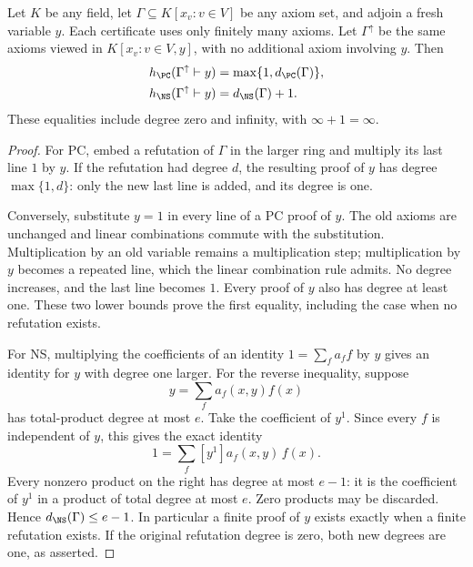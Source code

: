 \begin{proposition}\label{prop:fresh-target}
Let $K$ be any field, let $\Gamma\subseteq K[x_v:v\in V]$ be any axiom
set, and adjoin a fresh variable $y$. Each certificate uses only
finitely many axioms. Let $\Gamma^\uparrow$ be the same axioms viewed
in $K[x_v:v\in V,y]$, with no additional axiom involving $y$. Then
\begin{equation}\label{eq:fresh-identities}
 \begin{aligned}
 h_{\PC}(\Gamma^\uparrow\vdash y)
       &=\max\{1,d_{\PC}(\Gamma)\},\\
 h_{\NS}(\Gamma^\uparrow\vdash y)
       &=d_{\NS}(\Gamma)+1.
 \end{aligned}
\end{equation}
These equalities include degree zero and infinity, with
$\infty+1=\infty$.
\end{proposition}
\begin{proof}
For PC, embed a refutation of $\Gamma$ in the larger ring and multiply
its last line $1$ by $y$. If the refutation had degree $d$, the resulting
proof of $y$ has degree $\max\{1,d\}$: only the new last line is added,
and its degree is one.

Conversely, substitute $y=1$ in every line of a PC proof of $y$.
The old axioms are unchanged and linear combinations commute with the
substitution. Multiplication by an old variable remains a multiplication
step; multiplication by $y$ becomes a repeated line, which the linear
combination rule admits. No degree increases, and the last line becomes
$1$. Every proof of $y$ also has degree at least one. These two lower
bounds prove the first equality, including the case when no refutation
exists.

For NS, multiplying the coefficients of an identity
$1=\sum_fa_ff$ by $y$ gives an identity for $y$ with degree one larger.
For the reverse inequality, suppose
\[
                    y=\sum_f a_f(x,y)f(x)
\]
has total-product degree at most $e$. Take the coefficient of $y^1$.
Since every $f$ is independent of $y$, this gives the exact identity
\[
                    1=\sum_f [y^1]a_f(x,y)\,f(x).
\]
Every nonzero product on the right has degree at most $e-1$: it is the
coefficient of $y^1$ in a product of total degree at most $e$. Zero
products may be discarded. Hence $d_{\NS}(\Gamma)\le e-1$.
In particular a finite proof of $y$ exists exactly when a finite
refutation exists. If the original refutation degree is zero, both
new degrees are one, as asserted.
\end{proof}

